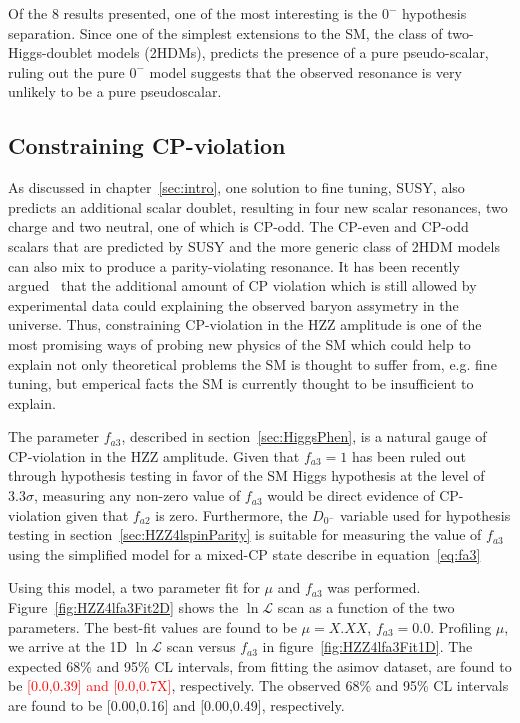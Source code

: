 Of the 8 results presented, one of the most interesting is the 
$0^-$ hypothesis separation.  Since one of the simplest extensions
to the SM, the class of two-Higgs-doublet models (2HDMs), 
predicts the presence of a pure pseudo-scalar, ruling out the 
pure $0^-$ model suggests that the observed resonance is very 
unlikely to be a pure pseudoscalar. 

\subsection{Constraining CP-violation}
\label{sec:HZZ4lcpViolation}

As discussed in chapter~\ref{sec:intro}, one solution to 
fine tuning, SUSY, also predicts an additional scalar doublet, 
resulting in four new 
scalar resonances, two charge and two neutral, one of which 
is CP-odd.  
The CP-even and CP-odd
scalars that are predicted by SUSY and the more generic class
of 2HDM models can also mix to produce a parity-violating 
resonance.  
It has been recently argued~\cite{Shu:2013uua} that
the additional amount of CP violation which is still allowed by
experimental data could explaining the observed baryon assymetry
in the universe.  Thus, constraining CP-violation in the HZZ 
amplitude is one of the most promising ways of probing
new physics of the SM which could help to explain not only 
theoretical problems the SM is thought to suffer from, e.g. 
fine tuning, but emperical facts the SM is currently thought to
be insufficient to explain.  

The parameter $f_{a3}$, described in section~\ref{sec:HiggsPhen},
is a natural gauge of CP-violation in the HZZ amplitude.  Given 
that $f_{a3}=1$
has been ruled out through hypothesis testing in favor of the
SM Higgs hypothesis at the level of $3.3\sigma$,  measuring any
non-zero value of $f_{a3}$ would be direct evidence of CP-violation
given that $f_{a2}$ is zero.  Furthermore, the $D_{0^-}$ variable 
used for hypothesis testing in section~\ref{sec:HZZ4lspinParity} 
is suitable for measuring the value of $f_{a3}$ using the 
simplified model for a mixed-CP state describe in 
equation~\ref{eq:fa3}

Using this model, a two parameter fit for $\mu$ and $f_{a3}$ was 
performed.  
Figure~\ref{fig:HZZ4lfa3Fit2D} shows the $\ln\mathscr{L}$ scan as a 
function of the two parameters.  The best-fit values are 
found to be $\mu=X.XX$, $f_{a3}=0.0$.  Profiling $\mu$, we 
arrive at the 1D $\ln\mathscr{L}$ scan versus $f_{a3}$ in 
figure~\ref{fig:HZZ4lfa3Fit1D}.  The expected 68\% and 95\% CL 
intervals, from fitting the asimov dataset, are found to be 
\textcolor{red}{[0.0,0.39] and [0.0,0.7X]}, respectively. 
The observed  68\% and 95\% CL 
intervals are found to be [0.00,0.16] and [0.00,0.49], 
respectively. 


